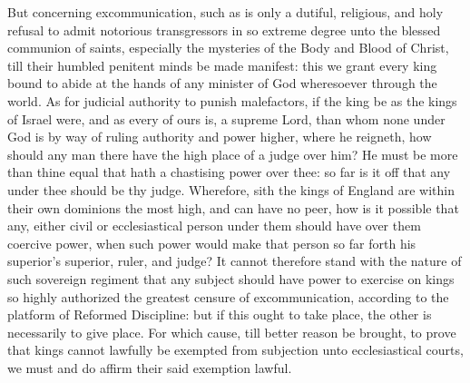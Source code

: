 But concerning excommunication, such as is only a dutiful, religious, and holy refusal to admit notorious transgressors in so extreme degree unto the blessed communion of saints, especially the mysteries of the Body and Blood of Christ, till their humbled penitent minds be made manifest: this we grant every king bound to abide at the hands of any minister of God wheresoever through the world. As for judicial authority to punish malefactors, if the king be as the kings of Israel were, and as every of ours is, a supreme Lord, than whom none under God is by way of ruling authority and power higher, where he reigneth, how should any man there have the high place of a judge over him? He must be more  than thine equal that hath a chastising power over thee: so far is it off that any under thee should be thy judge. Wherefore, sith the kings of England are within their own dominions the most high, and can have no peer, how is it possible that any, either civil or ecclesiastical person under them should have over them coercive power, when such power would make that person so far forth his superior’s superior, ruler, and judge? It cannot therefore stand with the nature of such sovereign regiment that any subject should have power to exercise on kings so highly authorized the greatest censure of excommunication, according to the platform of Reformed Discipline: but if this ought to take place, the other is necessarily to give place. For which cause, till better reason be brought, to prove that kings cannot lawfully be exempted from subjection unto ecclesiastical courts, we must and do affirm their said exemption lawful.



